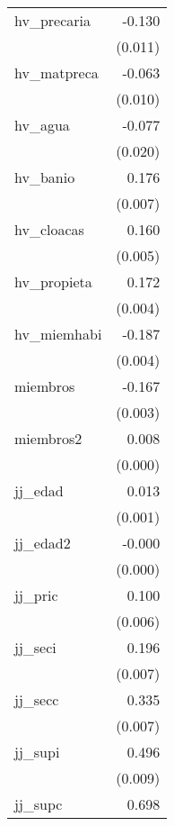 {\begin{longtable}{l*{1}{D{.}{.}{-1}}}
\addlinespace
hv\_precaria &      -0.130\sym{***}\\
            &     (0.011)         \\
\addlinespace
hv\_matpreca &      -0.063\sym{***}\\
            &     (0.010)         \\
\addlinespace
hv\_agua     &      -0.077\sym{***}\\
            &     (0.020)         \\
\addlinespace
hv\_banio    &       0.176\sym{***}\\
            &     (0.007)         \\
\addlinespace
hv\_cloacas  &       0.160\sym{***}\\
            &     (0.005)         \\
\addlinespace
hv\_propieta &       0.172\sym{***}\\
            &     (0.004)         \\
\addlinespace
hv\_miemhabi &      -0.187\sym{***}\\
            &     (0.004)         \\
\addlinespace
miembros    &      -0.167\sym{***}\\
            &     (0.003)         \\
\addlinespace
miembros2   &       0.008\sym{***}\\
            &     (0.000)         \\
\addlinespace
jj\_edad     &       0.013\sym{***}\\
            &     (0.001)         \\
\addlinespace
jj\_edad2    &      -0.000\sym{***}\\
            &     (0.000)         \\
\addlinespace
jj\_pric     &       0.100\sym{***}\\
            &     (0.006)         \\
\addlinespace
jj\_seci     &       0.196\sym{***}\\
            &     (0.007)         \\
\addlinespace
jj\_secc     &       0.335\sym{***}\\
            &     (0.007)         \\
\addlinespace
jj\_supi     &       0.496\sym{***}\\
            &     (0.009)         \\
\addlinespace
jj\_supc     &       0.698\sym{***}\\

\end{longtable}}
